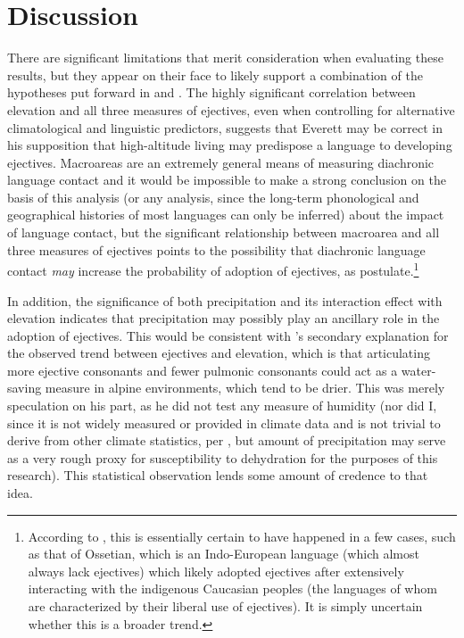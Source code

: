 \documentclass{article}
\begin{document}
\section{Discussion}
There are significant limitations that merit consideration when evaluating these results, but they appear on their face to likely support a combination of the hypotheses put forward in \textcite{everett2013} and \textcite{urban2021}. The highly significant correlation between elevation and all three measures of ejectives, even when controlling for alternative climatological and linguistic predictors, suggests that Everett may be correct in his supposition that high-altitude living may predispose a language to developing ejectives. Macroareas are an extremely general means of measuring diachronic language contact and it would be impossible to make a strong conclusion on the basis of this analysis (or any analysis, since the long-term phonological and geographical histories of most languages can only be inferred) about the impact of language contact, but the significant relationship between macroarea and all three measures of ejectives points to the possibility that diachronic language contact \emph{may} increase the probability of adoption of ejectives, as \textcite{urban2021} postulate.\footnote{According to \textcite{urban2021}, this is essentially certain to have happened in a few cases, such as that of Ossetian, which is an Indo-European language (which almost always lack ejectives) which likely adopted ejectives after extensively interacting with the indigenous Caucasian peoples (the languages of whom are characterized by their liberal use of ejectives). It is simply uncertain whether this is a broader trend.}

In addition, the significance of both precipitation and its interaction effect with elevation indicates that precipitation may possibly play an ancillary role in the adoption of ejectives. This would be consistent with \textcite{everett2013}'s secondary explanation for the observed trend between ejectives and elevation, which is that articulating more ejective consonants and fewer pulmonic consonants could act as a water-saving measure in alpine environments, which tend to be drier. This was merely speculation on his part, as he did not test any measure of humidity (nor did I, since it is not widely measured or provided in climate data and is not trivial to derive from other climate statistics, per \cite{eccel2012}, but amount of precipitation may serve as a very rough proxy for susceptibility to dehydration for the purposes of this research). This statistical observation lends some amount of credence to that idea.
\end{document}
